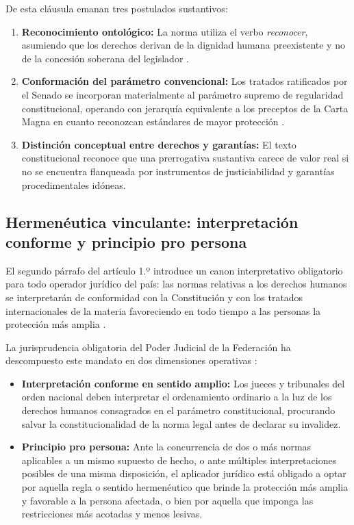 \documentclass[12pt,spanish,letterpaper,oneside]{article}
\begin{document}
De esta cl\'ausula emanan tres postulados sustantivos:
\begin{enumerate}
\item \textbf{Reconocimiento ontol\'ogico:} La norma utiliza el verbo \emph{reconocer}, asumiendo que los derechos derivan de la dignidad humana preexistente y no de la concesi\'on soberana del legislador \citep{scjnDignidad2016ADH}.
\item \textbf{Conformaci\'on del par\'ametro convencional:} Los tratados ratificados por el Senado se incorporan materialmente al par\'ametro supremo de regularidad constitucional, operando con jerarqu\'ia equivalente a los preceptos de la Carta Magna en cuanto reconozcan est\'andares de mayor protecci\'on \citep{scjnParametro2014ADH}.
\item \textbf{Distinci\'on conceptual entre derechos y garant\'ias:} El texto constitucional reconoce que una prerrogativa sustantiva carece de valor real si no se encuentra flanqueada por instrumentos de justiciabilidad y garant\'ias procedimentales id\'oneas.
\end{enumerate}

\subsection{Hermen\'eutica vinculante: interpretaci\'on conforme y principio pro persona}

El segundo p\'arrafo del art\'iculo 1.º introduce un canon interpretativo obligatorio para todo operador jur\'idico del pa\'is: las normas relativas a los derechos humanos se interpretar\'an de conformidad con la Constituci\'on y con los tratados internacionales de la materia favoreciendo en todo tiempo a las personas la protecci\'on m\'as amplia \citep{cpeumADH2026}.

La jurisprudencia obligatoria del Poder Judicial de la Federaci\'on ha descompuesto este mandato en dos dimensiones operativas \citep{scjnParametro2014ADH,scjnProPersona2016ADH}:
\begin{itemize}
\item \textbf{Interpretaci\'on conforme en sentido amplio:} Los jueces y tribunales del orden nacional deben interpretar el ordenamiento ordinario a la luz de los derechos humanos consagrados en el par\'ametro constitucional, procurando salvar la constitucionalidad de la norma legal antes de declarar su invalidez.
\item \textbf{Principio pro persona:} Ante la concurrencia de dos o m\'as normas aplicables a un mismo supuesto de hecho, o ante m\'ultiples interpretaciones posibles de una misma disposici\'on, el aplicador jur\'idico est\'a obligado a optar por aquella regla o sentido hermen\'eutico que brinde la protecci\'on m\'as amplia y favorable a la persona afectada, o bien por aquella que imponga las restricciones m\'as acotadas y menos lesivas.
\end{itemize}
\end{document}
